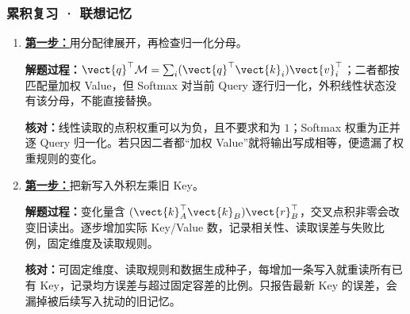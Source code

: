 \subsubsection*{累积复习 · 联想记忆}
\begin{enumerate}[label={},leftmargin=4.8em,itemsep=4pt]
\item[\textbf{R-17.}] \leavevmode{}\label{solution:R-17}\label{solution:review-memory-pipeline}\hyperref[exercise:review-memory-pipeline]{\textbf{第一步：}}用分配律展开，再检查归一化分母。\par\nobreak\textbf{解题过程：}$\vect{q}^\top\mathcal{M}=\sum_i(\vect{q}^\top\vect{k}_i)\vect{v}_i^\top$；二者都按匹配量加权 Value，但 Softmax 对当前 Query 逐行归一化，外积线性状态没有该分母，不能直接替换。\par\textbf{核对：}线性读取的点积权重可以为负，且不要求和为 $1$；Softmax 权重为正并逐 Query 归一化。若只因二者都“加权 Value”就将输出写成相等，便遗漏了权重规则的变化。
\item[\textbf{R-18.}] \leavevmode{}\label{solution:R-18}\label{solution:review-memory-correction}\hyperref[exercise:review-memory-correction]{\textbf{第一步：}}把新写入外积左乘旧 Key。\par\nobreak\textbf{解题过程：}变化量含 $(\vect{k}_A^\top\vect{k}_B)\vect{r}_B^\top$，交叉点积非零会改变旧读出。逐步增加实际 Key/Value 数，记录相关性、读取误差与失败比例，固定维度及读取规则。\par\textbf{核对：}可固定维度、读取规则和数据生成种子，每增加一条写入就重读所有已有 Key，记录均方误差与超过固定容差的比例。只报告最新 Key 的误差，会漏掉被后续写入扰动的旧记忆。
\end{enumerate}
